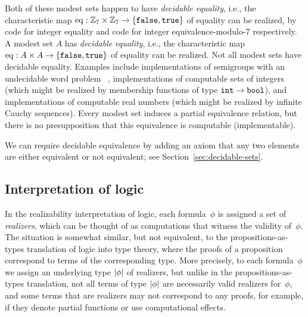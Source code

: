 Both of these modest sets happen to have \emph{decidable equality},
i.e., the characteristic map $\mathrm{eq} : \mathbb{Z}_7 \times
\mathbb{Z}_7 \to \{\mathtt{false}, \mathtt{true}\}$ of equality can be 
realized, by code for integer equality and code for integer equivalence-modulo-7
respectively.
\else
A modest set $A$ has \emph{decidable equality},
i.e., the characteristic map $\mathrm{eq} : A \times
A \to \{\mathtt{false}, \mathtt{true}\}$ of equality can be 
realized.
\fi %
%
Not all modest sets have decidable
equality.  Examples include implementations of semigroups with an undecidable word
problem~\cite{post47:_recur_unsol_probl_thue}%
\iflong
, implementations of computable sets of integers (which might be realized by
membership functions of type $\mathtt{int}\to\mathtt{bool}$), 
\fi
 and implementations of computable real numbers (which might be realized
by infinite Cauchy sequences).  Every modest set induces a partial equivalence relation, but there is no
presupposition that this equivalence is computable (implementable).

We can require decidable equivalence
by adding an axiom that any two elements are either equivalent
or not equivalent; see Section~\ref{sec:decidable-sets}.

\iflong\else\goodbreak\fi

\subsection{Interpretation of logic}
\label{sec:interpretation-logic}

In the realizability interpretation of logic, each formula~$\phi$ is
assigned a set of \emph{realizers}, which can be thought of as
computations that witness the validity of~$\phi$. The situation is
somewhat similar, but not equivalent, to the propositions-as-types
translation of logic into type theory, where the proofs of a
proposition correspond to terms of the corresponding type. More
precisely, to each formula~$\phi$ we assign an underlying type
$|\phi|$ of realizers, but unlike in the propositions-as-types
translation, not all terms of type $|\phi|$ are necessarily
valid realizers for~$\phi$, and some terms that are realizers may not
correspond to any proofs, for example, if they denote partial
functions or use computational effects.

